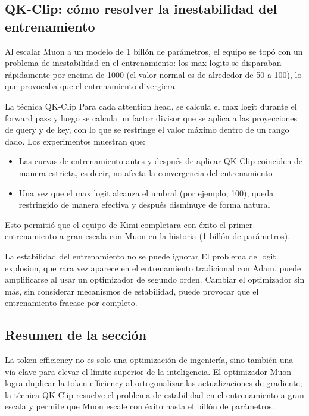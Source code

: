 \subsection{QK-Clip: cómo resolver la inestabilidad del entrenamiento}

Al escalar Muon a un modelo de 1 billón de parámetros, el equipo se topó con un problema de inestabilidad en el entrenamiento: los max logits se disparaban rápidamente por encima de 1000 (el valor normal es de alrededor de 50 a 100), lo que provocaba que el entrenamiento divergiera.

\begin{importantbox}{La técnica QK-Clip}
Para cada attention head, se calcula el max logit durante el forward pass y luego se calcula un factor divisor que se aplica a las proyecciones de query y de key, con lo que se restringe el valor máximo dentro de un rango dado. Los experimentos muestran que:
\begin{itemize}
    \item Las curvas de entrenamiento antes y después de aplicar QK-Clip coinciden de manera estricta, es decir, no afecta la convergencia del entrenamiento
    \item Una vez que el max logit alcanza el umbral (por ejemplo, 100), queda restringido de manera efectiva y después disminuye de forma natural
\end{itemize}
Esto permitió que el equipo de Kimi completara con éxito el primer entrenamiento a gran escala con Muon en la historia (1 billón de parámetros).
\end{importantbox}

\begin{warningbox}{La estabilidad del entrenamiento no se puede ignorar}
El problema de logit explosion, que rara vez aparece en el entrenamiento tradicional con Adam, puede amplificarse al usar un optimizador de segundo orden. Cambiar el optimizador sin más, sin considerar mecanismos de estabilidad, puede provocar que el entrenamiento fracase por completo.
\end{warningbox}

\subsection{Resumen de la sección}

La token efficiency no es solo una optimización de ingeniería, sino también una vía clave para elevar el límite superior de la inteligencia. El optimizador Muon logra duplicar la token efficiency al ortogonalizar las actualizaciones de gradiente; la técnica QK-Clip resuelve el problema de estabilidad en el entrenamiento a gran escala y permite que Muon escale con éxito hasta el billón de parámetros.


